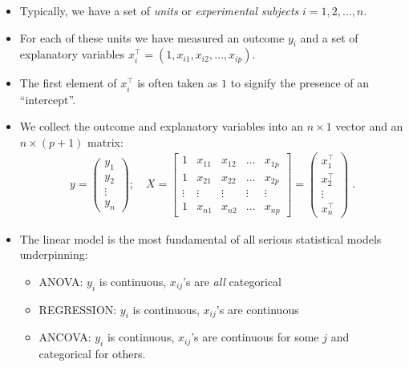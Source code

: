 \begin{frame}
 
\begin{itemize}\setlength{\itemsep}{0.4cm}
 \item Typically, we have a set of \emph{units} or \emph{experimental subjects} $i=1,2,\ldots,n$.

 \item For each of these units we have measured an outcome $y_i$ and a set of explanatory variables $x_i^{\top} = (1, x_{i1}, x_{i2}, \ldots, x_{ip})$. 

 \item The first element of $x_i^{\top}$ is often taken as $1$ to signify the presence of an ``intercept''. 
 
 \item We collect the outcome and explanatory variables into an $n\times 1$ vector and an $n\times (p+1)$ matrix:
\begin{align*}
 y = \begin{pmatrix} 
	y_1 \\
        y_2 \\
	\vdots \\
	y_n
       \end{pmatrix};\quad X = \begin{bmatrix}
			1 & x_{11} & x_{12} & \ldots & x_{1p} \\
			1 & x_{21} & x_{22} & \ldots & x_{2p} \\
			\vdots & \vdots & \vdots & \vdots & \vdots \\
			1 & x_{n1} & x_{n2} & \ldots & x_{np}
                       \end{bmatrix} = \begin{pmatrix} 
	x_1^{\top} \\
        x_2^{\top} \\
	\vdots \\
	x_n^{\top}
       \end{pmatrix}\; . 
\end{align*}

\end{itemize}

\end{frame}

\begin{frame}

\begin{itemize}
 \item The linear model is the most fundamental of all serious statistical models underpinning:
\vspace*{0.5cm}
	\begin{itemize}\setlength{\itemsep}{0.4cm}
	\item ANOVA: $y_i$ is continuous, $x_{ij}$'s are \emph{all} categorical
	\item REGRESSION: $y_i$ is continuous, $x_{ij}$'s are continuous
	\item ANCOVA: $y_i$ is continuous, $x_{ij}$'s are continuous for some $j$ and categorical for others. 
	\end{itemize}
\end{itemize} 
\end{frame}

